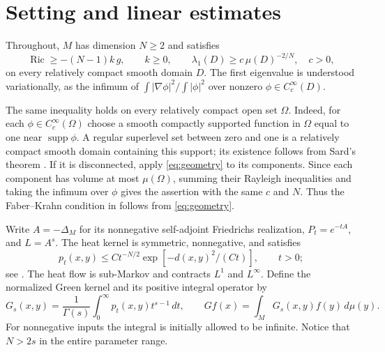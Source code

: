 \documentclass[11pt]{article}
\theoremstyle{definition}
\theoremstyle{remark}
\newcommand{\dd}{\,d\mu}
\newcommand{\intM}{\int_M}
\DeclareMathOperator{\Ric}{Ric}
\begin{document}
\section{Setting and linear estimates}\label{sec:setting}

Throughout, \(M\) has dimension \(N\ge2\) and satisfies
\begin{equation}\label{eq:geometry}
 \Ric\ge-(N-1)k\,g,\qquad k\ge0,\qquad
 \lambda_1(D)\ge c\,\mu(D)^{-2/N},\quad c>0,
\end{equation}
on every relatively compact smooth domain \(D\).
The first eigenvalue is understood variationally, as the infimum of
\(\int|\nabla\phi|^2/\int|\phi|^2\) over nonzero
\(\phi\in C_c^\infty(D)\).

The same inequality holds on every relatively compact open set
\(\Omega\). Indeed, for each \(\phi\in C_c^\infty(\Omega)\)
choose a smooth compactly supported function in \(\Omega\) equal
to one near \(\operatorname{supp}\phi\). A regular superlevel set
between zero and one is a relatively compact smooth domain containing
this support; its existence follows from Sard's theorem
\cite[Theorem~7.2]{Sard}. If it is disconnected, apply
\eqref{eq:geometry} to its components. Since each component has
volume at most \(\mu(\Omega)\), summing their Rayleigh inequalities
and taking the infimum over \(\phi\) gives the assertion with the
same \(c\) and \(N\). Thus the Faber--Krahn condition in
\cite[Assumption~2.1]{BBGM} follows from \eqref{eq:geometry}.

Write \(A=-\Delta_M\) for its nonnegative self-adjoint Friedrichs
realization, \(P_t=e^{-tA}\), and \(L=A^s\).
The heat kernel is symmetric, nonnegative, and satisfies
\begin{equation}\label{eq:gaussian}
 p_t(x,y)\le Ct^{-N/2}\exp[-d(x,y)^2/(Ct)],\qquad t>0;
\end{equation}
see \cite[(2.3)]{BBGM}. The heat flow is sub-Markov and contracts
\(L^1\) and \(L^\infty\). Define the normalized Green kernel and
its positive integral operator by
\begin{equation}\label{eq:green}
 G_s(x,y)=\frac1{\Gamma(s)}\int_0^\infty
 p_t(x,y)t^{s-1}\,dt,\qquad
 Gf(x)=\intM G_s(x,y)f(y)\dd(y).
\end{equation}
For nonnegative inputs the integral is initially allowed to be
infinite. Notice that \(N>2s\) in the entire parameter range.
\end{document}
